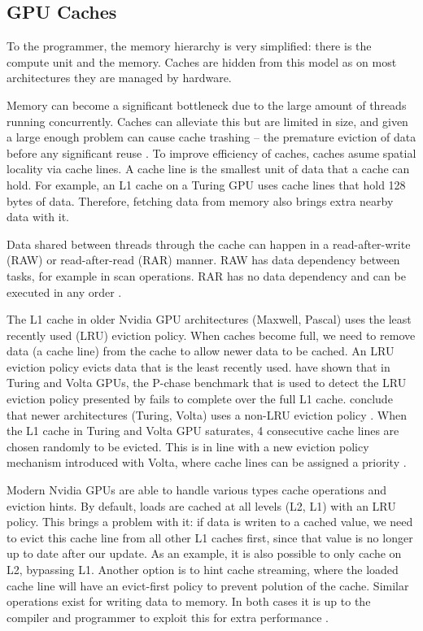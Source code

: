 \subsection{GPU Caches}
\label{sec:cache_gpu}
To the programmer, the memory hierarchy is very simplified: there is the compute unit and the memory.
Caches are hidden from this model as on most architectures they are managed by hardware.

Memory can become a significant bottleneck due to the large amount of threads running concurrently.
Caches can alleviate this but are limited in size, and given a large enough problem can cause cache trashing -- the premature eviction of data before any significant reuse \cite{dai2016model}.
To improve efficiency of caches, caches asume spatial locality via cache lines.
A cache line is the smallest unit of data that a cache can hold.
For example, an L1 cache on a Turing GPU uses cache lines that hold 128 bytes of data.
Therefore, fetching data from memory also brings extra nearby data with it.

Data shared between threads through the cache can happen in a read-after-write (RAW) or read-after-read (RAR) manner.
RAW has data dependency between tasks, for example in scan operations.
RAR has no data dependency and can be executed in any order \cite{tripathy2021paver}.

The L1 cache in older Nvidia GPU architectures (Maxwell, Pascal) uses the least recently used (LRU) eviction policy.
When caches become full, we need to remove data (a cache line) from the cache to allow newer data to be cached.
An LRU eviction policy evicts data that is the least recently used.
\citet{jia2019dissecting} have shown that in Turing and Volta GPUs, the P-chase benchmark that is used to detect the LRU eviction policy presented by \citet{mei2016dissecting} fails to complete over the full L1 cache.
\citeauthor{jia2019dissecting} conclude that newer architectures (Turing, Volta) uses a non-LRU eviction policy \cite{jia2019dissecting, jia2018dissecting,mei2016dissecting}.
When the L1 cache in Turing and Volta GPU saturates, 4 consecutive cache lines are chosen randomly to be evicted.
This is in line with a new eviction policy mechanism introduced with Volta, where cache lines can be assigned a priority \cite{jia2019dissecting,nvidia2021cudadocs}.

Modern Nvidia GPUs are able to handle various types cache operations and eviction hints.
By default, loads are cached at all levels (L2, L1) with an LRU policy.
This brings a problem with it: if data is writen to a cached value, we need to evict this cache line from all other L1 caches first, since that value is no longer up to date after our update.
As an example, it is also possible to only cache on L2, bypassing L1.
Another option is to hint cache streaming, where the loaded cache line will have an evict-first policy to prevent polution of the cache.
Similar operations exist for writing data to memory.
In both cases it is up to the compiler and programmer to exploit this for extra performance \cite{nvidia2021cudadocs}.

